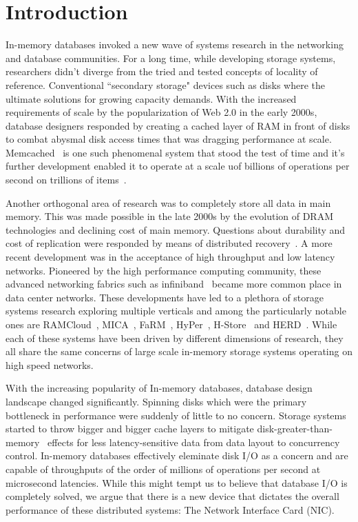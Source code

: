 
\chapter{Introduction}
In-memory databases invoked a new wave of systems research in the 
networking and database communities. For a long time, while developing storage
systems, researchers didn't diverge from the  tried and tested concepts of
locality of reference. Conventional ``secondary storage" devices
such as disks where the ultimate solutions for growing capacity demands. With the 
increased requirements of scale by the popularization of Web 2.0 in the early 2000s, 
database designers responded by creating a cached layer of RAM in front of disks
to combat abysmal disk access times that was dragging performance at scale. Memcached~\cite{memcached-orig}
is one such phenomenal system that stood the test of time and it's further development
enabled it to operate at a scale uof billions of operations per second on trillions of items~\cite{nishtala2013scaling}.

Another orthogonal area of research was to completely store all data in main memory.
This was made possible in the late 2000s by the evolution of DRAM technologies and declining cost of main memory.
Questions about durability and cost of replication 
were responded by means of distributed recovery~\cite{ongaro2011fast}. 
A more recent development was in the acceptance of high throughput and low latency networks. 
Pioneered by the high performance computing community, these advanced networking fabrics 
such as infiniband~\cite{pfister2001introduction} became more common place in 
data center networks. These developments have led to a plethora of storage systems research 
exploring multiple verticals and among the particularly notable ones are RAMCloud~\cite{ramcloud},
MICA~\cite{mica}, FaRM~\cite{farm}, HyPer~\cite{hyper}, H-Store~\cite{hstore} 
and HERD~\cite{herd}. While each of these systems have been driven by different dimensions 
of research, they all share the same concerns of large scale in-memory storage systems 
operating on high speed networks.

With the increasing popularity of In-memory databases, database design landscape changed significantly.
Spinning disks which were the primary bottleneck in performance were suddenly 
of little to no concern. Storage systems started to throw bigger and bigger cache layers to mitigate 
disk-greater-than-memory~\cite{couchbase} effects for less latency-sensitive data
from data layout to concurrency control. In-memory databases effectively eleminate disk I/O
as a concern and are capable of throughputs of the order of millions of operations per second
at microsecond latencies. While this might tempt us to believe that database I/O is completely
solved, we argue that there is a new device that dictates the overall performance of these 
distributed systems: The Network Interface Card (NIC).

